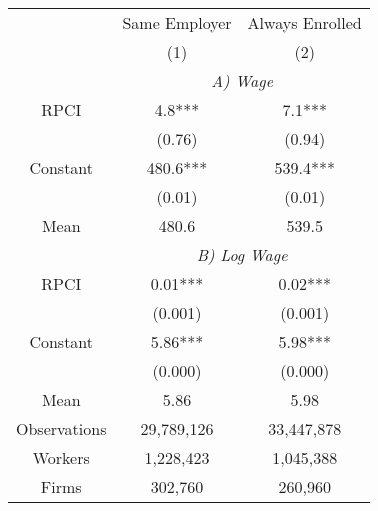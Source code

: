 \begin{tabular}{ccc}
\toprule
\toprule
      & Same Employer & Always Enrolled \\
      & (1)   & (2) \\
\cmidrule{2-3}      & \multicolumn{2}{c}{\textit{A) Wage}} \\
\midrule
RPCI  & 4.8*** & 7.1*** \\
      & (0.76) & (0.94) \\
Constant & 480.6*** & 539.4*** \\
      & (0.01) & (0.01) \\
Mean  & 480.6 & 539.5 \\
\cmidrule{2-3}      & \multicolumn{2}{c}{\textit{B) Log Wage}} \\
\midrule
RPCI  & 0.01*** & 0.02*** \\
      & (0.001) & (0.001) \\
Constant & 5.86*** & 5.98*** \\
      & (0.000) & (0.000) \\
Mean  & 5.86  & 5.98 \\
\midrule
Observations & 29,789,126 & 33,447,878 \\
Workers & 1,228,423 & 1,045,388 \\
Firms & 302,760 & 260,960 \\
\bottomrule
\bottomrule
\end{tabular}%
